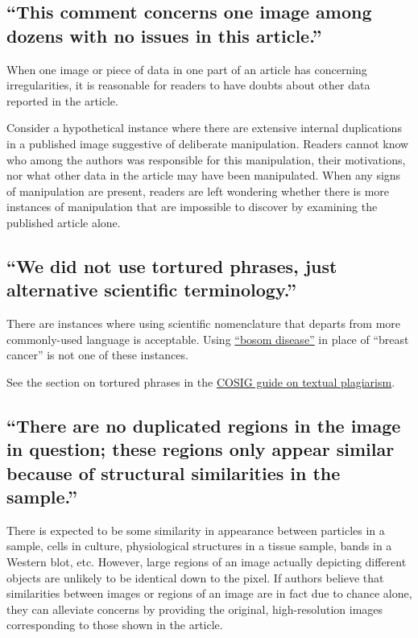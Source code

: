 \documentclass[letterpaper, 12pt]{article}
\begin{document}
\pagebreak

\subsection*{``This comment concerns one image among dozens with no issues in this article.''}

When one image or piece of data in one part of an article has concerning irregularities, it is reasonable for readers to have doubts about other data reported in the article.

Consider a hypothetical instance where there are extensive internal duplications in a published image suggestive of deliberate manipulation. Readers cannot know who among the authors was responsible for this manipulation, their motivations, nor what other data in the article may have been manipulated. When any signs of manipulation are present, readers are left wondering whether there is more instances of manipulation that are impossible to discover by examining the published article alone.

\subsection*{``We did not use tortured phrases, just alternative scientific terminology.''}

There are instances where using scientific nomenclature that departs from more commonly-used language is acceptable. Using \href{https://pubpeer.com/search?q=%22bosom+disease%22}{``bosom disease''} in place of ``breast cancer'' is not one of these instances.

See the section on tortured phrases in the \href{https://osf.io/ntcb4}{COSIG guide on textual plagiarism}.

\subsection*{``There are no duplicated regions in the image in question; these regions only appear similar because of structural similarities in the sample.''}

There is expected to be some similarity in appearance between particles in a sample, cells in culture, physiological structures in a tissue sample, bands in a Western blot, etc. However, large regions of an image actually depicting different objects are unlikely to be identical down to the pixel. If authors believe that similarities between images or regions of an image are in fact due to chance alone, they can alleviate concerns by providing the original, high-resolution images corresponding to those shown in the article.
\end{document}
